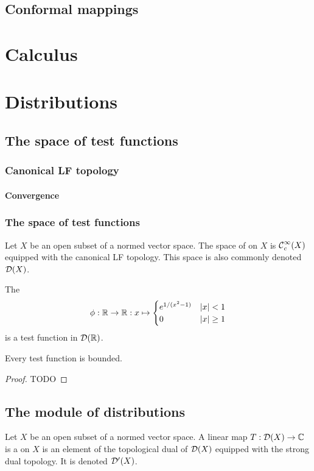\section{Conformal mappings}

\chapter{Calculus}



\chapter{Distributions}
\section{The space of test functions}
\subsection{Canonical LF topology}
\subsubsection{Convergence}
\subsection{The space of test functions}
\begin{definition}
Let $X$ be an open subset of a normed vector space. The space of  on $X$ is $\operatorname{\mathcal{C}}^\infty_c(X)$ equipped with the canonical LF topology. This space is also commonly denoted $\operatorname{\mathcal{D}}(X)$.
\end{definition}

\begin{example}
The 
\[ \phi: \mathbb{R}\to\mathbb{R}: x\mapsto \begin{cases}
e^{1/(x^2-1)} & |x|<1 \\ 0 & |x| \geq 1
\end{cases} \]
is a test function in $\operatorname{\mathcal{D}}(\mathbb{R})$.
\end{example}

\begin{lemma}
Every test function is bounded.
\end{lemma}
\begin{proof}
TODO
\end{proof}

\section{The module of distributions}
\begin{definition}
    Let $X$ be an open subset of a normed vector space.
    A linear map $T: \operatorname{\mathcal{D}}(X) \to \mathbb{C}$ is a  on $X$ is an element of the topological dual of $\operatorname{\mathcal{D}}(X)$ equipped with the strong dual topology. It is denoted $\operatorname{\mathcal{D}^\prime}(X)$.
\end{definition}

